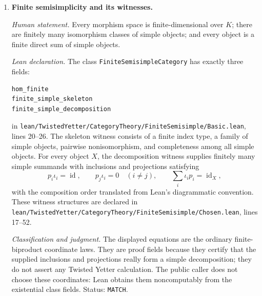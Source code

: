 \begin{enumerate}[label=\textbf{A\arabic*.},leftmargin=*]
\emph{Lean declaration.}
The class \texttt{FusionCategory} extends
\texttt{FiniteSemisimpleCategory K C} and has the single additional field
\begin{verbatim}
tensorUnit_simple : Simple (tensor unit)
\end{verbatim}
in \nolinkurl{lean/TwistedYetter/CategoryTheory/Fusion/Basic.lean}, lines
25--32.  Here ``tensor unit'' is the source expression \texttt{(one\_ C)}
written without its Unicode glyph.

\emph{Classification and judgment.}
Simplicity of the tensor unit is part of the definition of a fusion category,
not a project-specific proof shortcut.  The class assumes the standard
Mathlib linear, rigid, and monoidal interfaces rather than redefining their
coherence equations.  Status: \texttt{MATCH}.

\item \textbf{Finite semisimplicity and its witnesses.}

\emph{Human statement.}
Every morphism space is finite-dimensional over $K$; there are finitely many
isomorphism classes of simple objects; and every object is a finite direct sum
of simple objects.

\emph{Lean declaration.}
The class \texttt{FiniteSemisimpleCategory} has exactly three fields:
\begin{verbatim}
hom_finite
finite_simple_skeleton
finite_simple_decomposition
\end{verbatim}
in
\nolinkurl{lean/TwistedYetter/CategoryTheory/FiniteSemisimple/Basic.lean},
lines 20--26.  The skeleton witness consists of a finite index type, a family
of simple objects, pairwise nonisomorphism, and completeness among all simple
objects.  For every object $X$, the decomposition witness supplies finitely
many simple summands with inclusions and projections satisfying
\[
 p_i\iota_i=\operatorname{id},
 \qquad p_j\iota_i=0\quad(i\ne j),
 \qquad \sum_i\iota_i p_i=\operatorname{id}_X,
\]
with the composition order translated from Lean's diagrammatic convention.
These witness structures are declared in
\nolinkurl{lean/TwistedYetter/CategoryTheory/FiniteSemisimple/Chosen.lean},
lines 17--52.

\emph{Classification and judgment.}
The displayed equations are the ordinary finite-biproduct coordinate laws.
They are proof fields because they certify that the supplied inclusions and
projections really form a simple decomposition; they do not assert any
Twisted Yetter calculation.  The public caller does not choose these
coordinates: Lean obtains them noncomputably from the existential class
fields.  Status: \texttt{MATCH}.


\end{enumerate}
